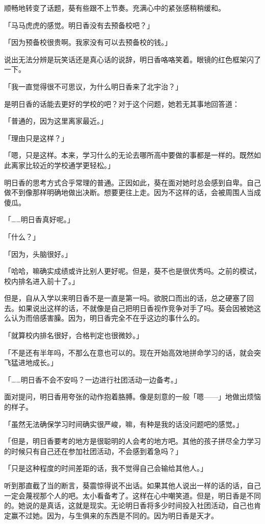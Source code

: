 \documentclass[UTF8]{ctexart}
\begin{document}
    顺畅地转变了话题，葵有些跟不上节奏。充满心中的紧张感稍稍缓和。

    「马马虎虎的感觉。明日香没有去预备校吧？」

    「因为预备校很贵啊。我家没有可以去预备校的钱。」

    说出无法分辨是玩笑话还是真心话的说辞，明日香咯咯笑着。眼镜的红色框架闪了一下。

    「我一直觉得很不可思议，为什么明日香来了北宇治？」

    是明日香的话能去更好的学校的吧？对于这个问题，她若无其事地回答道：

    「普通的，因为这里离家最近。」

    「理由只是这样？」

    「嗯，只是这样。本来，学习什么的无论去哪所高中要做的事都是一样的。既然如此离家比较近的学校通学更轻松。」

    明日香的思考方式合乎常理的普通。正因如此，葵在面对她时总会感到自卑。自己做不到像那样明确地做出决断。想要更往上走。因为不这样的话，会被周围人当成傻瓜。

    「……明日香真好呢。」

    「什么？」

    「因为，头脑很好。」

    「哈哈，嘛确实成绩或许比别人更好呢。但是，葵不也是很优秀吗。之前的模试，校内排名进入前十了。」

    但是，自从入学以来明日香不是一直是第一吗。欲脱口而出的话，总之硬塞了回去。如果说出这样的话，不就像是自己把明日香视作竞争对手了吗。葵会因被她这么认为而倍感害臊。因为，明日香完全不在乎这边的事什么的。

    「就算校内排名很好，合格判定也很微妙。」

    「不是还有半年吗，不那么在意也可以的。现在开始高效地拼命学习的话，就会突飞猛进地成长。」

    「……明日香不会不安吗？一边进行社团活动一边备考。」

    面对提问，明日香用夸张的动作抱着胳膊。像是刻意的一般「嗯——」地做出烦恼的样子。

    「虽然无法确保学习时间确实很严峻，嘛，有种是我的话没问题吧的感觉。」

    「但是，明日香要考的地方是很聪明的人会考的地方吧。其他的孩子拼尽全力学习的时候只有自己还在参加社团活动，不会感到着急吗？」

    「只是这种程度的时间差距的话，我不觉得自己会输给其他人。」

    听到那直截了当的断言，葵震惊得说不出话。如果其他人说出一样的话的话，自己一定会蔑视那个人的吧。太小看备考了。这样在心中嘲笑道。但是，明日香是不同的。她说的是真话，这就是现实。无论明日香将多少时间投入社团活动，自己也肯定赢不过她。因为，与生俱来的东西是不同的。因为明日香是天才。
\end{document}
